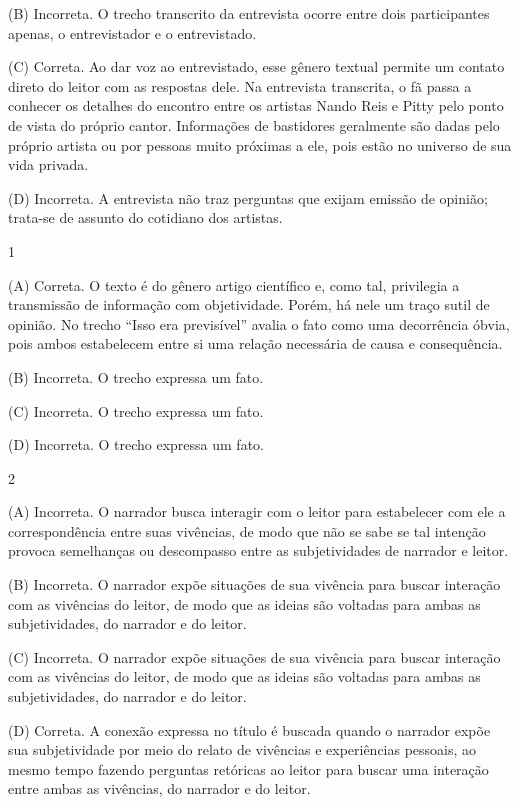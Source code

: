 (B) Incorreta. O trecho transcrito da entrevista ocorre entre dois
participantes apenas, o entrevistador e o entrevistado.

(C) Correta. Ao dar voz ao entrevistado, esse gênero textual permite um
contato direto do leitor com as respostas dele. Na entrevista
transcrita, o fã passa a conhecer os detalhes do encontro entre os
artistas Nando Reis e Pitty pelo ponto de vista do próprio cantor.
Informações de bastidores geralmente são dadas pelo próprio artista ou
por pessoas muito próximas a ele, pois estão no universo de sua vida
privada.

(D) Incorreta. A entrevista não traz perguntas que exijam emissão de
opinião; trata-se de assunto do cotidiano dos artistas.


\num{1}

(A) Correta. O texto é do gênero artigo científico e, como tal,
privilegia a transmissão de informação com objetividade. Porém, há nele
um traço sutil de opinião. No trecho ``Isso era previsível'' avalia o
fato como uma decorrência óbvia, pois ambos estabelecem entre si uma
relação necessária de causa e consequência. 

(B) Incorreta. O trecho
expressa um fato. 

(C) Incorreta. O trecho expressa um fato. 

(D) Incorreta. O trecho expressa um fato.

\num{2}

(A) Incorreta. O narrador busca interagir com o leitor para estabelecer
com ele a correspondência entre suas vivências, de modo que não se sabe
se tal intenção provoca semelhanças ou descompasso entre as
subjetividades de narrador e leitor. 

(B) Incorreta. O narrador expõe
situações de sua vivência para buscar interação com as vivências do
leitor, de modo que as ideias são voltadas para ambas as subjetividades,
do narrador e do leitor. 

(C) Incorreta. O narrador expõe situações de
sua vivência para buscar interação com as vivências do leitor, de modo
que as ideias são voltadas para ambas as subjetividades, do narrador e
do leitor. 

(D) Correta. A conexão expressa no título é buscada quando o
narrador expõe sua subjetividade por meio do relato de vivências e
experiências pessoais, ao mesmo tempo fazendo perguntas retóricas ao
leitor para buscar uma interação entre ambas as vivências, do narrador e
do leitor.

